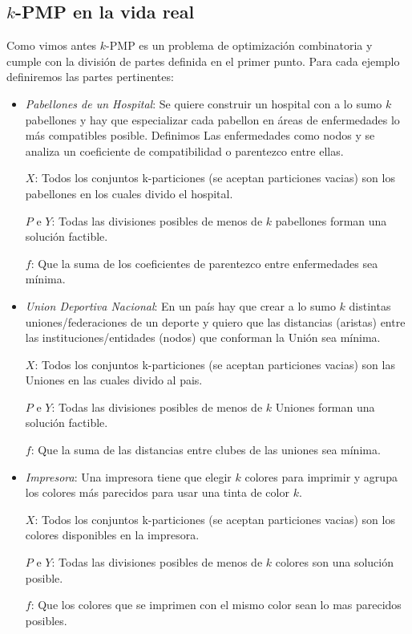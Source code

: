 \subsection{$k$-PMP en la vida real}
Como vimos antes $k$-PMP es un problema de optimización combinatoria y cumple con la división de partes definida en el primer punto.
Para cada ejemplo definiremos las partes pertinentes:
\begin{itemize}
  \item \textit{Pabellones de un Hospital}: Se quiere construir un hospital con a lo sumo $k$ pabellones y hay que especializar cada pabellon en áreas de enfermedades lo más compatibles posible. Definimos Las enfermedades como nodos y se analiza un coeficiente de compatibilidad o parentezco entre ellas.

  $X$: Todos los conjuntos k-particiones (se aceptan particiones vacias) son los pabellones en los cuales divido el hospital.

  $P$ e $Y$: Todas las divisiones posibles de menos de $k$ pabellones forman una solución factible.

  $f$: Que la suma de los coeficientes de parentezco entre enfermedades sea mínima.
  \item \textit{Union Deportiva Nacional}: En un país hay que crear a lo sumo $k$ distintas uniones/federaciones de un deporte y quiero que las distancias (aristas) entre las instituciones/entidades (nodos) que conforman la Unión sea mínima.

  $X$: Todos los conjuntos k-particiones (se aceptan particiones vacias) son las Uniones en las cuales divido al pais.

  $P$ e $Y$: Todas las divisiones posibles de menos de $k$ Uniones forman una solución factible.

  $f$: Que la suma de las distancias entre clubes de las uniones sea mínima.
  \item \textit{Impresora}: Una impresora tiene que elegir $k$ colores para imprimir y agrupa los colores más parecidos para usar una tinta de color $k$.

  $X$: Todos los conjuntos k-particiones (se aceptan particiones vacias) son los colores disponibles en la impresora.

  $P$ e $Y$: Todas las divisiones posibles de menos de $k$ colores son una solución posible.
  
  $f$: Que los colores que se imprimen con el mismo color sean lo mas parecidos posibles.
\end{itemize}
